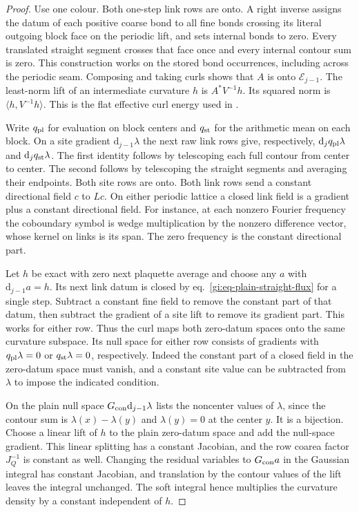 \documentclass[11pt,letterpaper,reqno]{amsart}
\numberwithin{equation}{section}
\renewcommand{\eqref}[1]{\textup{eq.~\ref{#1}}}
\theoremstyle{definition}
\theoremstyle{remark}
\begin{document}
\begin{proof}
Use one colour. Both one-step link rows are onto. A right inverse assigns the
datum of each positive coarse bond to all fine bonds crossing its
literal outgoing block face on the periodic lift, and sets internal
bonds to zero. Every translated
straight segment crosses that face once and every internal contour
sum is zero. This construction works on the stored bond occurrences,
including across the periodic seam. Composing and taking curls
shows that $A$ is onto $\mathcal E_{j-1}$. The least-norm lift
of an intermediate curvature $h$ is $A^*V^{-1}h$. Its squared
norm is $\langle h,V^{-1}h\rangle$. This is the flat effective
curl energy used in \cite[Proposition~4.1 and Corollary~4.3]{MB}.

Write $q_{\rm pl}$ for evaluation on block centers and $q_{\rm st}$
for the arithmetic mean on each block. On a site gradient
$\mathrm d_{j-1}\lambda$ the next raw link rows give, respectively,
$\mathrm d_j q_{\rm pl}\lambda$ and $\mathrm d_j q_{\rm st}\lambda$.
The first identity follows by telescoping each full contour from
center to center. The second follows by telescoping the straight
segments and averaging their endpoints. Both site rows are onto.
Both link rows send a constant directional field $c$ to $Lc$.
On either periodic lattice a closed link field is a gradient plus a
constant directional field. For instance, at each nonzero Fourier
frequency the coboundary symbol is wedge multiplication by the
nonzero difference vector, whose kernel on links is its span.
The zero frequency is the constant directional part.

Let $h$ be exact with zero next plaquette average and choose any
$a$ with $\mathrm d_{j-1}a=h$. Its next link datum is closed by
\eqref{gi:eq-plain-straight-flux} for a single step. Subtract a
constant fine field to remove the constant part of that datum,
then subtract the gradient of a site lift to remove its gradient
part. This works for either row. Thus the curl maps both zero-datum
spaces onto the same curvature subspace. Its null space for either
row consists of gradients with $q_{\rm pl}\lambda=0$ or
$q_{\rm st}\lambda=0$, respectively. Indeed the constant part of a
closed field in the zero-datum space must vanish, and a constant
site value can be subtracted from $\lambda$ to impose the indicated
condition.

On the plain null space $G_{\rm con}\mathrm d_{j-1}\lambda$ lists the
noncenter values of $\lambda$, since the contour sum is
$\lambda(x)-\lambda(y)$ and $\lambda(y)=0$ at the center $y$.
It is a bijection. Choose a linear lift of $h$ to the plain
zero-datum space and add the null-space gradient. This linear
splitting has a constant Jacobian, and the row coarea factor
$J_Q^{-1}$ is constant as well. Changing the
residual variables to $G_{\rm con}a$ in the Gaussian integral has constant
Jacobian, and translation by the contour values of the lift leaves
the integral unchanged. The soft integral hence multiplies the
curvature density by a constant independent of $h$.


\end{proof}
\end{document}
